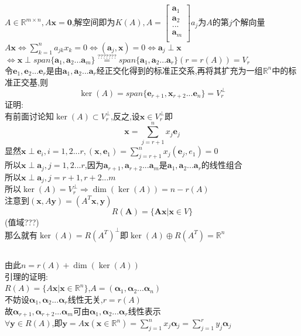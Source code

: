 \documentclass[11pt, a4paper, UTF8]{ctexart}
\begin{document}
\section{}
$A\in\mathbb{R}^{m\times n},A\bm x=\bm0$,解空间即为$K(A),A=\begin{bmatrix}
\bm a_1\\
\bm a_2\\
...\\
\bm a_m\\
\end{bmatrix}a_j$为$A$的第$j$个解向量\\
$A\bm x\Leftrightarrow\sum_{k=1}^na_{jk}x_k=0\Leftrightarrow(\bm a_j,\bm x)=0\Leftrightarrow\bm a_j\perp\bm x$\\
$\Leftrightarrow\bm x\perp span\{\bm a_1,\bm a_2...\bm a_m\}\overset{\mbox{???????}}{=}span\{\bm a_1,\bm a_2...\bm a_r\}(r=r(A))=V_r$\\
令$\bm e_1,\bm e_2...\bm e_r$是由$\bm a_1,\bm a_2...\bm a_r$经正交化得到的标准正交系,再将其扩充为一组$\mathbb{R}^n$中的标准正交基,则\\
\[\ker(A)=span\{\bm e_{r+1},\bm x_{r+2}...\bm e_n\}=V_r^\perp\]
证明:\\
有前面讨论知$\ker(A)\subset V_r^\perp$,反之,设$\bm x\in V_r^\perp$即\\
\[\bm x=\sum_{j=r+1}^nx_j\bm e_j\]
显然$\bm x\perp\bm e_i,i=1,2...r,(\bm x,\bm e_1)=\sum_{j=r+1}^nx_j(\bm e_j,e_1)=0$\\
所以$\bm x\perp\bm a_j,j=1,2...r$,因为$\bm a_{r+1},\bm a_{r+2}...\bm a_{m}$是$\bm a_1,\bm a_2...\bm a_{r}$的线性组合\\
所以$\bm x\perp\bm a_j,j=r+1,r+2...m$\\
所以$\ker(A)=V_r^\perp\Rightarrow\dim(\ker(A))=n-r(A)$\\
注意到$(\bm x,A\bm y)=(A^T\bm x,\bm y)$\\
\[R(\bm A)=\{\bm{Ax}|\bm x\in V\}\]
(值域???)\\
那么就有$\ker(A)=R(A^T)^\perp$即$\ker(A)\oplus R(A^T)=\mathbb{R}^n$\\
\subsection{}
由此$n=r(A)+\dim(\ker(A))$\\
引理的证明:\\
$R(A)=\{A\bm x|\bm x\in\mathbb{R}^n\}$,$A=(\bm\alpha_1,\bm\alpha_2...\bm\alpha_n)$\\
不妨设$\bm\alpha_1,\bm\alpha_2...\bm\alpha_r$线性无关,$r=r(A)$\\
故$\bm\alpha_{r+1},\bm\alpha_{r+2}...\bm\alpha_{m}$可由$\bm\alpha_1,\bm\alpha_2...\bm\alpha_r$线性表示\\
$\forall\bm y\in R(A)$,即$\bm y=A\bm x(\bm x\in\mathbb{R}^n)=\sum_{j=1}^nx_j\bm\alpha_j=\sum_{j=1}^ry_j\bm\alpha_j$\\
\end{document}
